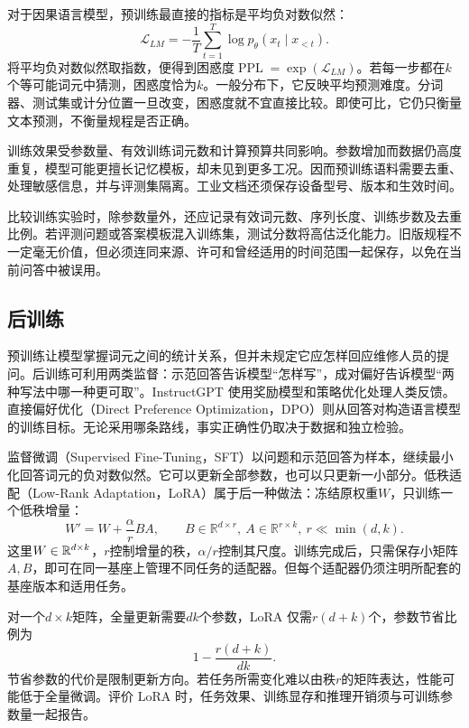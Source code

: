 对于因果语言模型，预训练最直接的指标是平均负对数似然：
\begin{equation}
 \mathcal{L}_{LM}=-\frac1T\sum_{t=1}^{T}\log p_\theta(x_t\mid x_{<t}).
\end{equation}
将平均负对数似然取指数，便得到困惑度$\operatorname{PPL}=\exp(\mathcal{L}_{LM})$。若每一步都在$k$个等可能词元中猜测，困惑度恰为$k$。一般分布下，它反映平均预测难度。分词器、测试集或计分位置一旦改变，困惑度就不宜直接比较。即使可比，它仍只衡量文本预测，不衡量规程是否正确。

训练效果受参数量、有效训练词元数和计算预算共同影响。参数增加而数据仍高度重复，模型可能更擅长记忆模板，却未见到更多工况。因而预训练语料需要去重、处理敏感信息，并与评测集隔离。工业文档还须保存设备型号、版本和生效时间。

比较训练实验时，除参数量外，还应记录有效词元数、序列长度、训练步数及去重比例。若评测问题或答案模板混入训练集，测试分数将高估泛化能力。旧版规程不一定毫无价值，但必须连同来源、许可和曾经适用的时间范围一起保存，以免在当前问答中被误用。

\subsection{后训练}
预训练让模型掌握词元之间的统计关系，但并未规定它应怎样回应维修人员的提问。后训练可利用两类监督：示范回答告诉模型“怎样写”，成对偏好告诉模型“两种写法中哪一种更可取”。InstructGPT 使用奖励模型和策略优化处理人类反馈\cite{ouyang2022instruct}。直接偏好优化（Direct Preference Optimization，DPO）则从回答对构造语言模型的训练目标\cite{rafailov2023dpo}。无论采用哪条路线，事实正确性仍取决于数据和独立检验。

监督微调（Supervised Fine-Tuning，SFT）以问题和示范回答为样本，继续最小化回答词元的负对数似然。它可以更新全部参数，也可以只更新一小部分。低秩适配（Low-Rank Adaptation，LoRA）属于后一种做法：冻结原权重$W$，只训练一个低秩增量\cite{hu2021lora}：
\begin{equation}
 W'=W+\frac{\alpha}{r}BA,\qquad B\in\mathbb{R}^{d\times r},\ A\in\mathbb{R}^{r\times k},\ r\ll\min(d,k).
\end{equation}
这里$W\in\mathbb{R}^{d\times k}$，$r$控制增量的秩，$\alpha/r$控制其尺度。训练完成后，只需保存小矩阵$A,B$，即可在同一基座上管理不同任务的适配器。但每个适配器仍须注明所配套的基座版本和适用任务。

对一个$d\times k$矩阵，全量更新需要$dk$个参数，LoRA 仅需$r(d+k)$个，参数节省比例为
\begin{equation}
 1-\frac{r(d+k)}{dk}.
\end{equation}
节省参数的代价是限制更新方向。若任务所需变化难以由秩$r$的矩阵表达，性能可能低于全量微调。评价 LoRA 时，任务效果、训练显存和推理开销须与可训练参数量一起报告。


